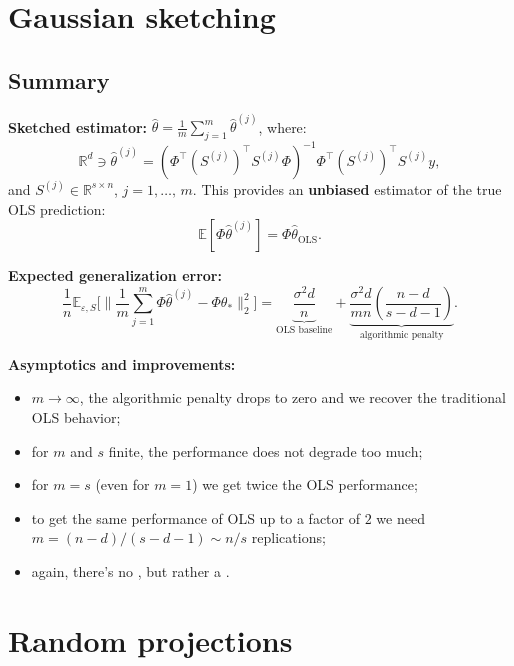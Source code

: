 \documentclass[
11pt,notheorems,hyperref={pdfauthor=whatever}
]{beamer}
\begin{document}
\section{Gaussian sketching}
\subsection{Summary}
\begin{frame}
    \textbf{Sketched estimator:} 
    \(\hat{\theta} = \frac{1}{m} \sum_{j=1}^m \hat{\theta}^{(j)}\), where:
    \[
        \mathbb{R}^d\ni\hat{\theta}^{(j)} = (\Phi^\top(S^{(j)})^\top S^{(j)}\Phi)^{-1}\Phi^\top(S^{(j)})^\top S^{(j)}y,
    \]
    and \(S^{(j)} \in \mathbb{R}^{s \times n}\), \(j=1,\dots,\,m\).
    This provides an \alert{\textbf{unbiased}} estimator of the true OLS prediction: 
    \[
        \mathbb{E}[\Phi\hat{\theta}^{(j)}] = \Phi\hat{\theta}_{\text{OLS}}.
    \]

    \vspace{0.5em}
    \textbf{Expected generalization error:}
    \[
        \frac{1}{n} \mathbb{E}_{\varepsilon, S} \Bigg[ \bigg\| \frac{1}{m} \sum_{j=1}^m \Phi\hat{\theta}^{(j)} - \Phi\theta_* \bigg\|_2^2 \Bigg]=\underbrace{\frac{\sigma^2 d}{n}}_{\text{OLS baseline}} + \underbrace{\frac{\sigma^2 d}{mn}\left(\frac{n-d}{s-d-1}\right)}_{\text{algorithmic penalty}}.
    \]

    \vspace{0.5em}
    \textbf{Asymptotics and improvements:}
    \begin{itemize}
        \item \(m \to \infty\), the algorithmic penalty drops to zero and we recover the traditional OLS behavior;
        \item for \(m\) and \(s\) finite, the performance does not degrade too much;
        \item for \(m=s\) (even for \(m=1\)) we get twice the OLS performance;
        \item to get the same performance of OLS up to a factor of \(2\) we need \(m=(n-d)/(s-d-1)\sim n/s\) replications;
        \item again, there's no , but rather a .
    \end{itemize}
\end{frame}


\section{Random projections}
\end{document}
